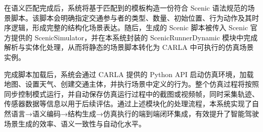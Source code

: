 在语义匹配完成后，系统将基于匹配到的模板构造一份符合 Scenic 语法规范的场景脚本。该脚本会明确指定交通参与者的类型、数量、初始位置、行为动作及其时序逻辑，形成完整的结构化场景表达。随后，生成的 Scenic 脚本被传入 Scenic 官方提供的 ScenicSimulator，并在本系统封装的 ScenicRunnerDynamic 模块中完成解析与实体化处理，从而将静态的场景脚本转化为 CARLA 中可执行的仿真场景实例。

完成脚本加载后，系统会通过 CARLA 提供的 Python API 启动仿真环境，加载地图、设置天气、创建交通主体，并执行场景中定义的行为。整个仿真过程将按照同步控制模式运行，并自动保存仿真运行过程中的截图或视频帧，同时采集轨迹、传感器数据等信息以用于后续评估。通过上述模块化的处理流程，本系统实现了自然语言→语义编码→结构生成→仿真执行的端到端闭环集成，有效提升了智能驾驶场景生成的效率、语义一致性与自动化水平。



